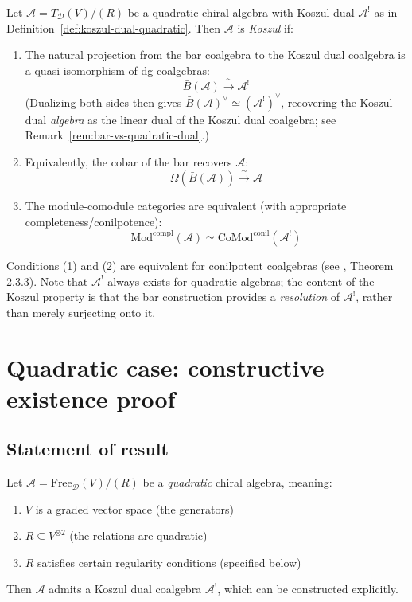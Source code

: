 \begin{definition}\label{def:koszul-property-existence}
Let $\mathcal{A} = T_{\mathcal{D}}(V)/(R)$ be a quadratic chiral algebra with
Koszul dual $\mathcal{A}^!$ as in Definition~\ref{def:koszul-dual-quadratic}.
Then $\mathcal{A}$ is \emph{Koszul} if:
\begin{enumerate}
\item The natural projection from the bar coalgebra to the Koszul dual
      coalgebra is a quasi-isomorphism of dg coalgebras:
      \[\bar{B}(\mathcal{A}) \xrightarrow{\;\sim\;} \mathcal{A}^!\]
      (Dualizing both sides then gives
      $\bar{B}(\mathcal{A})^{\vee} \simeq (\mathcal{A}^!)^{\vee}$,
      recovering the Koszul dual \emph{algebra} as the linear dual of
      the Koszul dual coalgebra; see
      Remark~\ref{rem:bar-vs-quadratic-dual}.)
\item Equivalently, the cobar of the bar recovers $\mathcal{A}$:
      \[\Omega(\bar{B}(\mathcal{A})) \xrightarrow{\;\sim\;} \mathcal{A}\]
\item The module-comodule categories are equivalent (with appropriate completeness/conilpotence):
      \[\mathrm{Mod}^{\mathrm{compl}}(\mathcal{A}) \simeq \mathrm{CoMod}^{\mathrm{conil}}(\mathcal{A}^!)\]
\end{enumerate}
Conditions (1) and (2) are equivalent for conilpotent coalgebras
(see \cite{LV12}, Theorem 2.3.3).  Note that $\mathcal{A}^!$ always exists for
quadratic algebras; the content of the Koszul property is that the bar
construction provides a \emph{resolution} of $\mathcal{A}^!$, rather than merely
surjecting onto it.
\end{definition}


\section{Quadratic case: constructive existence proof}
\label{sec:quadratic-existence}

\subsection{Statement of result}

\begin{theorem}\label{thm:quadratic-have-duals}
Let $\mathcal{A} = \text{Free}_{\mathcal{D}}(V) / (R)$ be a \emph{quadratic} 
chiral algebra, meaning:
\begin{enumerate}
\item $V$ is a graded vector space (the generators)
\item $R \subseteq V^{\otimes 2}$ (the relations are quadratic)
\item $R$ satisfies certain regularity conditions (specified below)
\end{enumerate}

Then $\mathcal{A}$ admits a Koszul dual coalgebra $\mathcal{A}^!$, which can be 
constructed explicitly.
\end{theorem}

